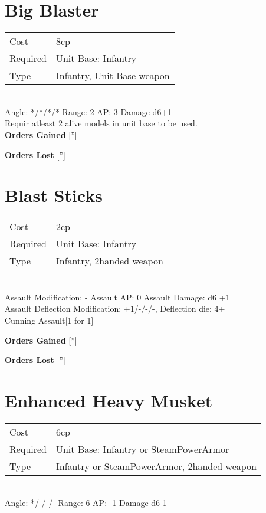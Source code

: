 \pagebreak\section{ Big Blaster }

\begin{tabular}{ll}
    Cost & 8cp \\
    Required & Unit Base: Infantry\\
    Type & Infantry, Unit Base weapon\\
\end{tabular}
\ \\
\indent Angle: */*/*/* Range: 2  AP: 3 Damage d6+1 \\
Requir atleast 2 alive models in unit base to be used.
\ \\

{\bf Orders Gained}
['']

{\bf Orders Lost}
['']
\section{ Blast Sticks }

\begin{tabular}{ll}
    Cost & 2cp \\
    Required & Unit Base: Infantry\\
    Type & Infantry, 2handed weapon\\
\end{tabular}
\ \\
Assault Modification: - Assault AP: 0 Assault Damage: d6 +1\\
Assault Deflection Modification: +1/-/-/-, Deflection die: 4+ \\
Cunning Assault[1 for 1]



{\bf Orders Gained}
['']

{\bf Orders Lost}
['']
\section{ Enhanced Heavy Musket }

\begin{tabular}{ll}
    Cost & 6cp \\
    Required & Unit Base: Infantry or SteamPowerArmor\\
    Type & Infantry or SteamPowerArmor, 2handed weapon\\
\end{tabular}
\ \\
\indent Angle: */-/-/- Range: 6  AP: -1 Damage d6-1 \\

